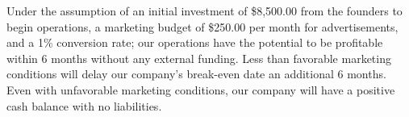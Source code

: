 Under the assumption of an initial investment of \$8,500.00 from the founders to begin operations, a marketing budget of \$250.00 per month for advertisements, and a 1\% conversion rate; our operations have the potential to be profitable within 6 months without any external funding. Less than favorable marketing conditions will delay our company's break-even date an additional 6 months. Even with unfavorable marketing conditions, our company will have a positive cash balance with no liabilities.





